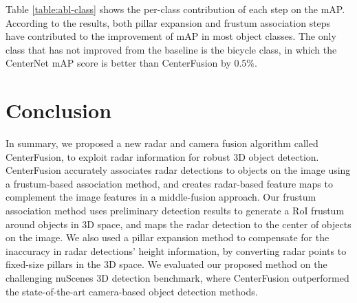 \documentclass[10pt,twocolumn,letterpaper]{article}
\begin{document}
   Table \ref{table:abl-class} shows the per-class contribution of each step on the mAP.
   According to the results, both pillar expansion and 
   frustum association steps have contributed to the improvement of mAP in most 
   object classes. The only class that has not improved from the baseline is the 
   bicycle class, in which the CenterNet mAP score is better than CenterFusion by 
   0.5\%.
   
   
   \section{Conclusion}
   In summary, we proposed a new radar and camera fusion algorithm called CenterFusion,
   to exploit radar information for robust 3D object detection. CenterFusion accurately 
   associates radar detections to objects on the image using a frustum-based 
   association method, and creates radar-based feature maps to complement the image 
   features in a middle-fusion approach. Our frustum association method uses 
   preliminary detection results to generate a RoI frustum around objects in 3D space, 
   and maps the radar detection to the center of objects on the image. We also 
   used a pillar expansion method to compensate for the inaccuracy in radar detections' 
   height information, by converting radar points to fixed-size pillars
   in the 3D space. We evaluated our proposed method on the challenging nuScenes 3D 
   detection benchmark, where CenterFusion outperformed the state-of-the-art camera-based 
   object detection methods. 


{\small


}
\end{document}
